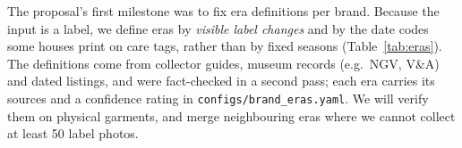 The proposal's first milestone was to fix era definitions per brand. Because the input is a label,
we define eras by \emph{visible label changes} and by the date codes some houses print on care
tags, rather than by fixed seasons (Table~\ref{tab:eras}). The definitions come from collector
guides, museum records (e.g.\ NGV, V\&A) and dated listings, and were fact-checked in a second
pass; each era carries its sources and a confidence rating in
\texttt{configs/brand\_eras.yaml}. We will verify them on physical garments, and merge
neighbouring eras where we cannot collect at least 50 label photos.
